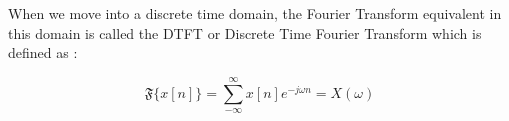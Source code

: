 When we move into a discrete time domain, the Fourier Transform equivalent
in this domain is called the DTFT or Discrete Time Fourier Transform
which is defined as \cite{kamen2000fundamentals}:

\begin{equation}
\mathfrak{F}\{ x[n] \} = \displaystyle\sum_{- \infty}^{\infty} x[n] e^{-j \omega n} = X(\omega)
\label{eq:c41}
\end{equation} 



